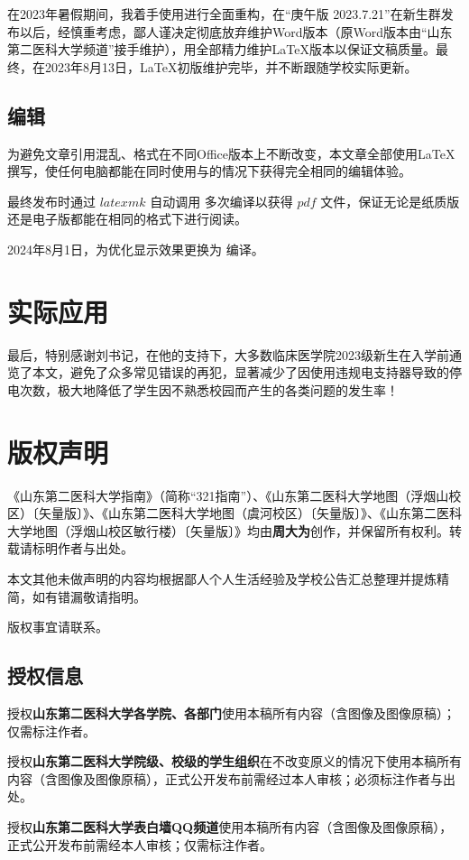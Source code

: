 在2023年暑假期间，我着手使用\XeLaTeX 进行全面重构，在“庚午版 2023.7.21”在新生群发布以后，经慎重考虑，鄙人谨决定彻底放弃维护Word版本（原Word版本由“山东第二医科大学频道”接手维护），用全部精力维护LaTeX版本以保证文稿质量。最终，在2023年8月13日，LaTeX初版维护完毕，并不断跟随学校实际更新。

\subsection[编辑]{编辑}
为避免文章引用混乱、格式在不同Office版本上不断改变，本文章全部使用\LaTeX 撰写，使任何电脑都能在同时使用与\footnotemark 的情况下获得完全相同的编辑体验\footnotemark。
\addtocounter{footnote}{1}

最终发布时通过 $latexmk$ 自动调用 \XeTeX 多次编译以获得 $pdf$ 文件，保证无论是纸质版还是电子版都能在相同的格式下进行阅读。

2024年8月1日，为优化显示效果更换为 \LuaTeX 编译。

\section[实际应用]{实际应用}
最后，特别感谢刘书记，在他的支持下，大多数临床医学院2023级新生在入学前通览了本文，避免了众多常见错误的再犯，显著减少了因使用违规电支持器导致的停电次数，极大地降低了学生因不熟悉校园而产生的各类问题的发生率！

\section[版权声明]{版权声明}
\label{copyright}
《山东第二医科大学指南》（简称“321指南”）、《山东第二医科大学地图（浮烟山校区）〔矢量版〕》、《山东第二医科大学地图（虞河校区）〔矢量版〕》、《山东第二医科大学地图（浮烟山校区敏行楼）〔矢量版〕》均由\textbf{周大为}创作，并保留所有权利。转载请标明作者与出处。

本文其他未做声明的内容均根据鄙人个人生活经验及学校公告汇总整理并提炼精简，如有错漏敬请指明。

版权事宜请联系。

\subsection[授权信息]{授权信息}
授权\textbf{山东第二医科大学各学院、各部门}使用本稿所有内容（含图像及图像原稿）；仅需标注作者。

授权\textbf{山东第二医科大学院级、校级的学生组织}在不改变原义的情况下使用本稿所有内容（含图像及图像原稿），正式公开发布前需经过本人审核；必须标注作者与出处。

授权\textbf{山东第二医科大学表白墙QQ频道}使用本稿所有内容（含图像及图像原稿），正式公开发布前需经本人审核；仅需标注作者。
